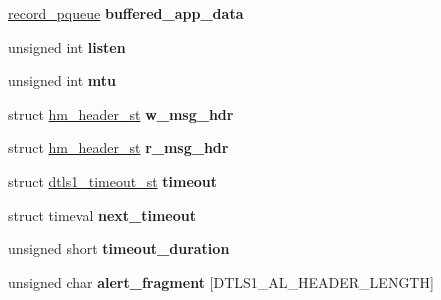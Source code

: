 \begin{DoxyCompactItemize}
\item 
\hypertarget{structdtls1__state__st_a00969b1c93b0b229fbb98a4aabe9cd01}{}\hyperlink{structrecord__pqueue__st}{record\+\_\+pqueue} {\bfseries buffered\+\_\+app\+\_\+data}\label{structdtls1__state__st_a00969b1c93b0b229fbb98a4aabe9cd01}

\item 
\hypertarget{structdtls1__state__st_a834e8572b18cebed829621b26f629715}{}unsigned int {\bfseries listen}\label{structdtls1__state__st_a834e8572b18cebed829621b26f629715}

\item 
\hypertarget{structdtls1__state__st_a0518fb297c24c3b28e9ee3122be2967a}{}unsigned int {\bfseries mtu}\label{structdtls1__state__st_a0518fb297c24c3b28e9ee3122be2967a}

\item 
\hypertarget{structdtls1__state__st_aa16e59d7f125177caa2b5939fcb13890}{}struct \hyperlink{structhm__header__st}{hm\+\_\+header\+\_\+st} {\bfseries w\+\_\+msg\+\_\+hdr}\label{structdtls1__state__st_aa16e59d7f125177caa2b5939fcb13890}

\item 
\hypertarget{structdtls1__state__st_a1c6a7daa242306285d142a607d0a63b1}{}struct \hyperlink{structhm__header__st}{hm\+\_\+header\+\_\+st} {\bfseries r\+\_\+msg\+\_\+hdr}\label{structdtls1__state__st_a1c6a7daa242306285d142a607d0a63b1}

\item 
\hypertarget{structdtls1__state__st_af619339c285b02986b695f6d505f1c36}{}struct \hyperlink{structdtls1__timeout__st}{dtls1\+\_\+timeout\+\_\+st} {\bfseries timeout}\label{structdtls1__state__st_af619339c285b02986b695f6d505f1c36}

\item 
\hypertarget{structdtls1__state__st_a499a60c3bed45a4de6da508430035578}{}struct timeval {\bfseries next\+\_\+timeout}\label{structdtls1__state__st_a499a60c3bed45a4de6da508430035578}

\item 
\hypertarget{structdtls1__state__st_ad5deca28499d48a4faa5fae12f621d93}{}unsigned short {\bfseries timeout\+\_\+duration}\label{structdtls1__state__st_ad5deca28499d48a4faa5fae12f621d93}

\item 
\hypertarget{structdtls1__state__st_a7fc037708d5e02c3b7e401aa06bf8df9}{}unsigned char {\bfseries alert\+\_\+fragment} \mbox{[}D\+T\+L\+S1\+\_\+\+A\+L\+\_\+\+H\+E\+A\+D\+E\+R\+\_\+\+L\+E\+N\+G\+T\+H\mbox{]}\label{structdtls1__state__st_a7fc037708d5e02c3b7e401aa06bf8df9}


\end{DoxyCompactItemize}
